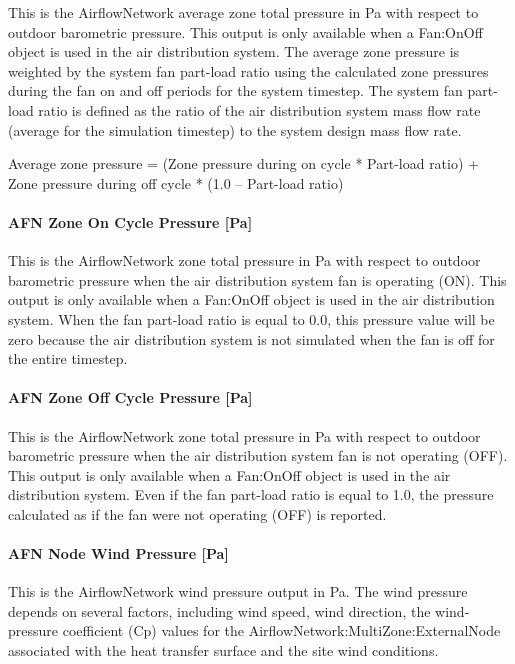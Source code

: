This is the AirflowNetwork average zone total pressure in Pa with respect to outdoor barometric pressure. This output is only available when a Fan:OnOff object is used in the air distribution system. The average zone pressure is weighted by the system fan part-load ratio using the calculated zone pressures during the fan on and off periods for the system timestep. The system fan part-load ratio is defined as the ratio of the air distribution system mass flow rate (average for the simulation timestep) to the system design mass flow rate.

Average zone pressure = (Zone pressure during on cycle * Part-load ratio) + Zone pressure during off cycle * (1.0 -- Part-load ratio)

\paragraph{AFN Zone On Cycle Pressure {[}Pa{]}}\label{afn-zone-on-cycle-pressure-pa}

This is the AirflowNetwork zone total pressure in Pa with respect to outdoor barometric pressure when the air distribution system fan is operating (ON). This output is only available when a Fan:OnOff object is used in the air distribution system. When the fan part-load ratio is equal to 0.0, this pressure value will be zero because the air distribution system is not simulated when the fan is off for the entire timestep.

\paragraph{AFN Zone Off Cycle Pressure {[}Pa{]}}\label{afn-zone-off-cycle-pressure-pa}

This is the AirflowNetwork zone total pressure in Pa with respect to outdoor barometric pressure when the air distribution system fan is not operating (OFF). This output is only available when a Fan:OnOff object is used in the air distribution system. Even if the fan part-load ratio is equal to 1.0, the pressure calculated as if the fan were not operating (OFF) is reported.

\paragraph{AFN Node Wind Pressure {[}Pa{]}}\label{afn-node-wind-pressure-pa}

This is the AirflowNetwork wind pressure output in Pa. The wind pressure depends on several factors, including wind speed, wind direction, the wind-pressure coefficient (Cp) values for the AirflowNetwork:MultiZone:ExternalNode associated with the heat transfer surface and the site wind conditions.


